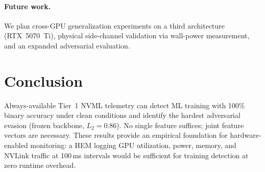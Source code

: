 \documentclass[midterm]{sparreport}
\begin{document}
\paragraph{Future work.}
We plan cross-GPU generalization experiments on a third architecture (RTX~5070~Ti), physical side-channel validation via wall-power measurement, and an expanded adversarial evaluation.

\section{Conclusion}

Always-available Tier~1 NVML telemetry can detect ML training with 100\% binary accuracy under clean conditions and identify the hardest adversarial evasion (frozen backbone, $L_2 = 0.86$).
No single feature suffices; joint feature vectors are necessary.
These results provide an empirical foundation for hardware-enabled monitoring: a HEM logging GPU utilization, power, memory, and NVLink traffic at 100\,ms intervals would be sufficient for training detection at zero runtime overhead.



\end{document}

